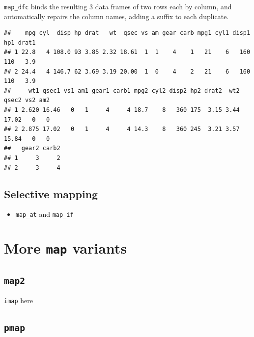 \documentclass[]{book}
\newenvironment{Shaded}{}{}
\newcommand{\DataTypeTok}[1]{\textcolor[rgb]{0.56,0.13,0.00}{#1}}
\newcommand{\DecValTok}[1]{\textcolor[rgb]{0.25,0.63,0.44}{#1}}
\newcommand{\KeywordTok}[1]{\textcolor[rgb]{0.00,0.44,0.13}{\textbf{#1}}}
\newcommand{\NormalTok}[1]{#1}
\newcommand{\OperatorTok}[1]{\textcolor[rgb]{0.40,0.40,0.40}{#1}}
\newcommand{\StringTok}[1]{\textcolor[rgb]{0.25,0.44,0.63}{#1}}
\providecommand{\tightlist}{%
  \setlength{\itemsep}{0pt}\setlength{\parskip}{0pt}}
\begin{document}
\texttt{map\_dfc} binds the resulting 3 data frames of two rows each by column, and automatically repairs the column names, adding a suffix to each duplicate.

\begin{Shaded}
\end{Shaded}

\begin{verbatim}
##    mpg cyl  disp hp drat   wt  qsec vs am gear carb mpg1 cyl1 disp1 hp1 drat1
## 1 22.8   4 108.0 93 3.85 2.32 18.61  1  1    4    1   21    6   160 110   3.9
## 2 24.4   4 146.7 62 3.69 3.19 20.00  1  0    4    2   21    6   160 110   3.9
##     wt1 qsec1 vs1 am1 gear1 carb1 mpg2 cyl2 disp2 hp2 drat2  wt2 qsec2 vs2 am2
## 1 2.620 16.46   0   1     4     4 18.7    8   360 175  3.15 3.44 17.02   0   0
## 2 2.875 17.02   0   1     4     4 14.3    8   360 245  3.21 3.57 15.84   0   0
##   gear2 carb2
## 1     3     2
## 2     3     4
\end{verbatim}

\hypertarget{selective-mapping}{%
\subsection{Selective mapping}\label{selective-mapping}}

\begin{itemize}
\tightlist
\item
  \texttt{map\_at} and \texttt{map\_if}
\end{itemize}

\hypertarget{more-map-variants}{%
\section{\texorpdfstring{More \texttt{map} variants}{More map variants}}\label{more-map-variants}}

\hypertarget{map2}{%
\subsection{\texorpdfstring{\texttt{map2}}{map2}}\label{map2}}

\texttt{imap} here

\hypertarget{pmap}{%
\subsection{\texorpdfstring{\texttt{pmap}}{pmap}}\label{pmap}}
\end{document}
